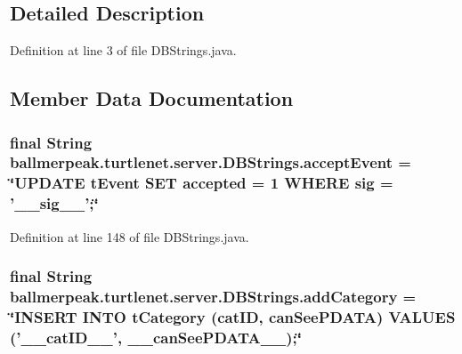 \subsection{Detailed Description}


Definition at line 3 of file D\-B\-Strings.\-java.



\subsection{Member Data Documentation}
\hypertarget{classballmerpeak_1_1turtlenet_1_1server_1_1DBStrings_acf9b2fff82aaa6ad4d024ff69d1cba96}{
\subsubsection[{accept\-Event}]{\setlength{\rightskip}{0pt plus 5cm}final String ballmerpeak.\-turtlenet.\-server.\-D\-B\-Strings.\-accept\-Event = \char`\"{}U\-P\-D\-A\-T\-E t\-Event S\-E\-T accepted = 1 W\-H\-E\-R\-E sig = '\-\_\-\-\_\-sig\-\_\-\-\_\-';\char`\"{}\hspace{0.3cm}{\ttfamily [static]}}}\label{classballmerpeak_1_1turtlenet_1_1server_1_1DBStrings_acf9b2fff82aaa6ad4d024ff69d1cba96}


Definition at line 148 of file D\-B\-Strings.\-java.

\hypertarget{classballmerpeak_1_1turtlenet_1_1server_1_1DBStrings_a4de95aa5509b7246d85f48577ea3822e}{
\subsubsection[{add\-Category}]{\setlength{\rightskip}{0pt plus 5cm}final String ballmerpeak.\-turtlenet.\-server.\-D\-B\-Strings.\-add\-Category = \char`\"{}I\-N\-S\-E\-R\-T I\-N\-T\-O t\-Category (cat\-I\-D, {\bf can\-See\-P\-D\-A\-T\-A}) V\-A\-L\-U\-E\-S ('\-\_\-\-\_\-cat\-I\-D\-\_\-\-\_\-', \-\_\-\-\_\-can\-See\-P\-D\-A\-T\-A\-\_\-\-\_\-);\char`\"{}\hspace{0.3cm}{\ttfamily [static]}}}\label{classballmerpeak_1_1turtlenet_1_1server_1_1DBStrings_a4de95aa5509b7246d85f48577ea3822e}


